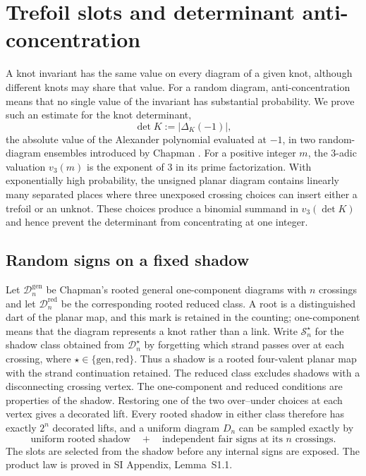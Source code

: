 \documentclass[9pt,twoside]{pnas-new}
\theoremstyle{definition}
\theoremstyle{remark}
\newcommand{\SILocation}[1]{SI Appendix, #1}
\newcommand{\SIShadowSignLaw}{Lemma~S1.1}
\begin{document}
\section{Trefoil slots and determinant anti-concentration}
\label{sec:trefoil-slots}
A knot invariant has the same value on every diagram of a given knot, although different knots may share that value.  For a random diagram, anti-concentration means that no single value of the invariant has substantial probability.  We prove such an estimate for the knot determinant,
\[
 \det K:=\lvert\Delta_K(-1)\rvert,
\]
the absolute value of the Alexander polynomial evaluated at $-1$, in two random-diagram ensembles introduced by Chapman \cite{chapman2017}.  For a positive integer $m$, the $3$-adic valuation $v_3(m)$ is the exponent of $3$ in its prime factorization.  With exponentially high probability, the unsigned planar diagram contains linearly many separated places where three unexposed crossing choices can insert either a trefoil or an unknot.  These choices produce a binomial summand in $v_3(\det K)$ and hence prevent the determinant from concentrating at one integer.

\subsection{Random signs on a fixed shadow}
Let $\mathcal D_n^{\mathrm{gen}}$ be Chapman's rooted general one-component diagrams with $n$ crossings and let $\mathcal D_n^{\mathrm{red}}$ be the corresponding rooted reduced class.  A root is a distinguished dart of the planar map, and this mark is retained in the counting; one-component means that the diagram represents a knot rather than a link.  Write $\mathcal S_n^{\star}$ for the shadow class obtained from $\mathcal D_n^{\star}$ by forgetting which strand passes over at each crossing, where $\star\in\{\mathrm{gen},\mathrm{red}\}$.  Thus a shadow is a rooted four-valent planar map with the strand continuation retained.  The reduced class excludes shadows with a disconnecting crossing vertex.  The one-component and reduced conditions are properties of the shadow.  Restoring one of the two over--under choices at each vertex gives a decorated lift.  Every rooted shadow in either class therefore has exactly $2^n$ decorated lifts, and a uniform diagram $D_n$ can be sampled exactly by
\[
 \text{uniform rooted shadow}
 \quad+\quad
 \text{independent fair signs at its }n\text{ crossings}.
\]
The slots are selected from the shadow before any internal signs are exposed. The product law is proved in \SILocation{\SIShadowSignLaw{}}.
\end{document}
